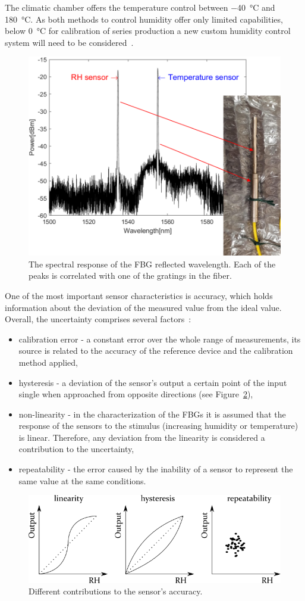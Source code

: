 The climatic chamber offers the temperature control between \SI{-40}{\celsius} and \SI{180}{\celsius}. As both methods to control humidity offer only limited capabilities, below \SI{0}{\celsius} for calibration of series production a new custom humidity control system will need to be considered~\cite{Berruti, Veldscholte:2021wjt}.
\begin{figure}[!h]
\centering
\includegraphics[width=0.6\columnwidth]{Chapter5/images/hygr.png}
\caption{The spectral response of the FBG reflected wavelength. Each of the peaks is correlated with one of the gratings in the fiber.}
\label{fig_hygrometer1}
\end{figure}
\newpage
One of the most important sensor characteristics is accuracy, which holds information about the deviation of the measured value from the ideal value. Overall, the uncertainty comprises several factors~\cite{sensors_physics}:
\begin{itemize}
    \item calibration error - a constant error over the whole range of measurements, its source is related to the accuracy of the reference device and the calibration method applied,
    \item hysteresis - a deviation of the sensor's output a certain point of the input single when approached from opposite directions (see Figure~\ref{fig:accuracy}), 
    \item non-linearity - in the characterization of the \glspl{FBG} it is assumed that the response of the sensors to the stimulus (increasing humidity or temperature) is linear. Therefore, any deviation from the linearity is considered a contribution to the uncertainty,
    \item repeatability - the error caused by the inability of a sensor to represent the same value at the same conditions. 
\end{itemize}
\begin{figure}[!h]
\centering
\includegraphics[width=0.85\columnwidth]{Chapter5/images/Picture2.png}
\caption{Different contributions to the sensor's accuracy.}
\label{fig:accuracy}
\end{figure}
